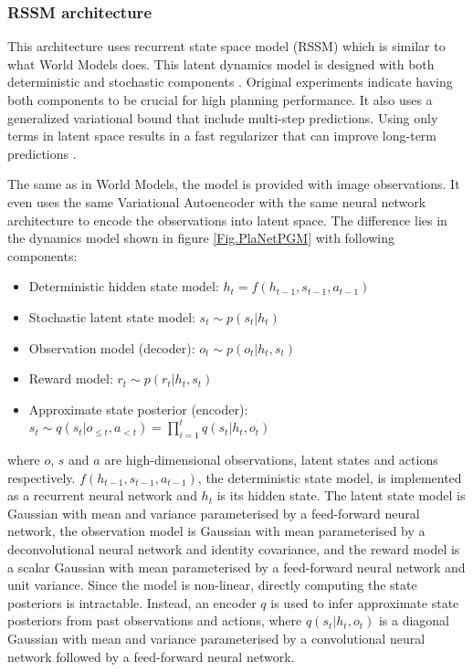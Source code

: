 \subsubsection{RSSM architecture}

This architecture uses recurrent state space model (RSSM) which is similar to what World Models does. This latent dynamics model is designed with both deterministic and stochastic components \cite{Algo.FastGenerativeModels}. Original experiments indicate having both components to be crucial for high planning performance. It also uses a generalized variational bound that include multi-step predictions. Using only terms in latent space results in a fast regularizer that can improve long-term predictions \cite{Algo.PlaNet}.

The same as in World Models, the model is provided with image observations. It even uses the same Variational Autoencoder with the same neural network architecture to encode the observations into latent space. The difference lies in the dynamics model shown in figure \ref{Fig.PlaNetPGM} with following components:
\begin{itemize}
\item Deterministic hidden state model:      $h_t = f(h_{t-1}, s_{t-1}, a_{t-1})$
\item Stochastic latent state model:         $s_t \sim p(s_t|h_t)$
\item Observation model (decoder):           $o_t \sim p(o_t|h_t, s_t)$
\item Reward model:                          $r_t \sim p(r_t|h_t, s_t)$
\item Approximate state posterior (encoder): $s_t \sim q(s_t|o_{\leqslant t}, a_{< t}) = \prod_{i=1}^tq(s_t|h_t,o_t)$
\end{itemize}
where $o$, $s$ and $a$ are high-dimensional observations, latent states and actions respectively. $f(h_{t-1}, s_{t-1}, a_{t-1})$, the deterministic state model, is implemented as a recurrent neural network and $h_t$ is its hidden state. The latent state model is Gaussian with mean and variance parameterised by a feed-forward neural network, the observation model is Gaussian with mean parameterised by a deconvolutional neural network and identity covariance, and the reward model is a scalar Gaussian with mean parameterised by a feed-forward neural network and unit variance. Since the model is non-linear, directly computing the state posteriors is intractable. Instead, an encoder $q$ is used to infer approximate state posteriors from past observations and actions, where $q(s_t | h_t, o_t)$ is a diagonal Gaussian with mean and variance parameterised by a convolutional neural network followed by a feed-forward neural network.

